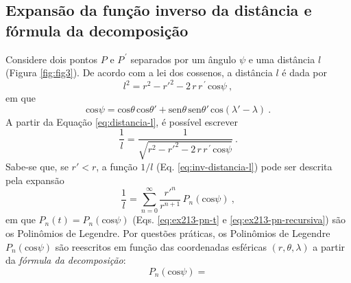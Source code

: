 \documentclass[10pt,a4paper,fleqn]{article}
\begin{document}
\subsection{Expans\~{a}o da fun\c{c}\~{a}o inverso da dist\^{a}ncia e f\'{o}rmula 
da decomposi\c{c}\~{a}o}

Considere dois pontos $P$ e $P^{\,\prime}$ separados por um ângulo $\psi$ e
uma distância $l$ (Figura \ref{fig:fig3}). De acordo com a lei dos cossenos,
a distância $l$ é dada por
\begin{equation}
l^{2} = r^{2} - r'^{2} - 2 \, r \, r^{\,\prime} \, \text{cos}\psi \: ,
\label{eq:distancia-l}
\end{equation}
em que
\begin{equation}
\text{cos}\psi = \text{cos}\theta \, \text{cos}\theta' + 
                 \text{sen}\theta \, \text{sen}\theta' \, \text{cos}(\lambda' - \lambda) \: .
\label{eq:cos-psi}
\end{equation}
A partir da Equa\c{c}ão \ref{eq:distancia-l}, é possível escrever
\begin{equation}
\dfrac{1}{l} = \dfrac{1}{\sqrt{r^{2} - r'^{2} - 2 \, r \, r^{\,\prime} \, \text{cos}\psi}} \: .
\label{eq:inv-distancia-l}
\end{equation}
Sabe-se que, se $r' < r$, a fun\c{c}ão $1/l$ (Eq. \ref{eq:inv-distancia-l}) pode
ser descrita pela expansão
\begin{equation}
\dfrac{1}{l} = \sum_{n=0}^{\infty} \dfrac{r'^{n}}{r^{n+1}} \, P_{n}(\text{cos}\psi) \: ,
\label{eq:inv-distancia-l-Pn}
\end{equation}
em que $P_{n}(t) = P_{n}(\text{cos}\psi)$ (Eqs. \ref{eq:ex213-pn-t} e \ref{eq:ex213-pn-recursiva})
são os Polinômios de Legendre. Por questões práticas, os Polinômios de Legendre 
$P_{n}(\text{cos}\psi)$ são reescritos em fun\c{c}ão das coordenadas esféricas 
$(r, \theta, \lambda)$ a partir da \textit{fórmula da decomposi\c{c}ão}:
\begin{equation}
P_{n}(\text{cos}\psi) = 
\label{eq:formula-decomposicao}
\end{equation}
\end{document}
